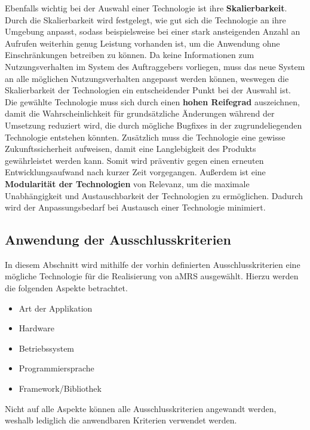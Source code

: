 \newparagraph
Ebenfalls wichtig bei der Auswahl einer Technologie ist ihre \textbf{Skalierbarkeit}. 
Durch die Skalierbarkeit wird festgelegt, wie gut sich die Technologie an ihre Umgebung anpasst, sodass beispielsweise bei einer stark ansteigenden Anzahl an Aufrufen weiterhin genug Leistung vorhanden ist, um die Anwendung ohne Einschränkungen betreiben zu können. 
Da keine Informationen zum Nutzungsverhalten im System des Auftraggebers vorliegen, muss das neue System an alle möglichen Nutzungsverhalten angepasst werden können, weswegen die Skalierbarkeit der Technologien ein entscheidender Punkt bei der Auswahl ist.
\newparagraph
Die gewählte Technologie muss sich durch einen \textbf{hohen Reifegrad} auszeichnen, damit die Wahrscheinlichkeit für grundsätzliche Änderungen während der Umsetzung reduziert wird, die durch mögliche Bugfixes in der zugrundeliegenden Technologie entstehen könnten.
Zusätzlich muss die Technologie eine gewisse Zukunftssicherheit aufweisen, damit eine Langlebigkeit des Produkts gewährleistet werden kann. 
Somit wird präventiv gegen einen erneuten Entwicklungsaufwand nach kurzer Zeit vorgegangen.
\newparagraph
Außerdem ist eine \textbf{Modularität der Technologien} von Relevanz, um die maximale Unabhängigkeit und Austauschbarkeit der Technologien zu ermöglichen. 
Dadurch wird der Anpassungsbedarf bei Austausch einer Technologie minimiert.

\subsection{Anwendung der Ausschlusskriterien}
In diesem Abschnitt wird mithilfe der vorhin definierten Ausschlusskriterien eine mögliche Technologie für die Realisierung von \ac{aMRS} ausgewählt. Hierzu werden die folgenden Aspekte betrachtet.
\begin{itemize}
  \item Art der Applikation
  \item Hardware
  \item Betriebssystem
  \item Programmiersprache
  \item Framework/Bibliothek
\end{itemize}\noindent
Nicht auf alle Aspekte können alle Ausschlusskriterien angewandt werden, weshalb lediglich die anwendbaren Kriterien verwendet werden.
